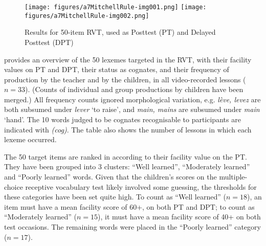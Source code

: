 \documentclass[output=paper]{langscibook}
\begin{document}
\begin{figure}
\texttt{[image: figures/a7MitchellRule-img001.png]}
\texttt{[image: figures/a7MitchellRule-img002.png]}
\caption{\label{fig:mitchell:1}Results for 50-item RVT, used as Posttest (PT) and Delayed Posttest (DPT)}
\end{figure}

 provides an overview of the 50 lexemes targeted in the RVT, with their facility values on PT and DPT, their status as cognates, and their frequency of production by the teacher and by the children, in all video-recorded lessons ($n= 33$). (Counts of individual and group productions by children have been merged.) All frequency counts ignored morphological variation, e.g. \textit{lève, levez} are both subsumed under \textit{lever} `to raise', and \textit{main, mains} are subsumed under \textit{main} `hand'. The 10 words judged to be cognates recognisable to participants are indicated with \textit{(cog)}. The table also shows the number of lessons in which each lexeme occurred.

The 50 target items are ranked in  according to their facility value on the PT. They have been grouped into 3 clusters: ``Well learned'', ``Moderately learned''  and ``Poorly learned'' words. Given that the children’s scores on the multiple-choice receptive vocabulary test likely involved some guessing, the thresholds for these categories have been set quite high. To count as ``Well learned'' ($n = 18$), an item must have a mean facility score of 60+, on both PT and DPT; to count as ``Moderately learned'' ($n = 15$), it must have a mean facility score of 40+ on both test occasions. The remaining words were placed in the ``Poorly learned'' category ($n = 17$).
\end{document}
